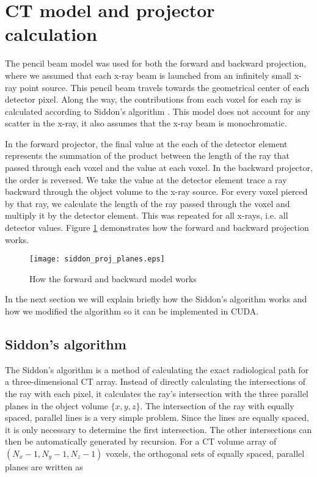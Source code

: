 \section{CT model and projector calculation}
The pencil beam model was used for both the forward and backward projection, where we assumed that each x-ray beam is launched from an infinitely small x-ray point source. This pencil beam travels towards the geometrical center of each detector pixel.  Along the way, the contributions from each voxel for each ray is calculated according to Siddon's algorithm \cite{Siddon1985}.  This model does not account for any scatter in the x-ray, it also assumes that the x-ray beam is monochromatic.

In the forward projector, the final value at the each of the detector element represents the summation of the product between the length of the ray that passed through each voxel and the value at each voxel.  In the backward projector, the order is reversed. We take the value at the detector element trace a ray backward through the object volume to the x-ray source.  For every voxel pierced by that ray, we calculate the length of the ray passed through the voxel and multiply it by the detector element.  This was repeated for all x-rays, i.e. all detector values.  Figure \ref{fig:forward_backward_model} demonstrates how the forward and backward projection works.

\begin{figure}
\centering
\texttt{[image: siddon\_proj\_planes.eps]}
\caption{How the forward and backward model works}
\label{fig:forward_backward_model}
\end{figure}

In the next section we will explain briefly how the Siddon's algorithm works and how we modified the algorithm so it can be implemented in CUDA. 

\subsection{Siddon's algorithm}
The Siddon's algorithm is a method of calculating the exact radiological path for a three-dimensional CT array.  Instead of directly calculating the intersections of the ray with each pixel, it calculates the ray's intersection with the three parallel planes in the object volume $\{ x, y, z \}$.  The intersection of the ray with equally spaced, parallel lines is a very simple problem.  Since the lines are equally spaced, it is only necessary to determine the first intersection.  The other intersections can then be automatically generated by recursion.  For a CT volume array of $(N_x -1, N_y-1, N_z-1)$ voxels, the orthogonal sets of equally spaced, parallel planes are written as

